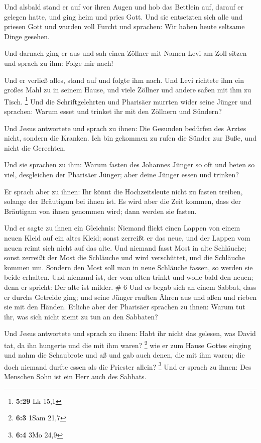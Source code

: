  Und alsbald stand er auf vor ihren Augen und hob das
Bettlein auf, darauf er gelegen hatte, und ging heim und pries Gott.
 Und sie entsetzten sich alle und priesen Gott und wurden
voll Furcht und sprachen: Wir haben heute seltsame Dinge gesehen.

 Und darnach ging er aus und sah einen Zöllner mit Namen
Levi am Zoll sitzen und sprach zu ihm: Folge mir nach!

 Und er verließ alles, stand auf und folgte ihm nach.
 Und Levi richtete ihm ein großes Mahl zu in seinem Hause,
und viele Zöllner und andere saßen mit ihm zu Tisch. \footnote{\textbf{5:29}
  Lk 15,1}  Und die Schriftgelehrten und Pharisäer murrten
wider seine Jünger und sprachen: Warum esset und trinket ihr mit den
Zöllnern und Sündern?

 Und Jesus antwortete und sprach zu ihnen: Die Gesunden
bedürfen des Arztes nicht, sondern die Kranken.  Ich bin
gekommen zu rufen die Sünder zur Buße, und nicht die Gerechten.

 Und sie sprachen zu ihm: Warum fasten des Johannes Jünger
so oft und beten so viel, desgleichen der Pharisäer Jünger; aber deine
Jünger essen und trinken?

 Er sprach aber zu ihnen: Ihr könnt die Hochzeitsleute
nicht zu fasten treiben, solange der Bräutigam bei ihnen ist.
 Es wird aber die Zeit kommen, dass der Bräutigam von ihnen
genommen wird; dann werden sie fasten.

 Und er sagte zu ihnen ein Gleichnis: Niemand flickt einen
Lappen von einem neuen Kleid auf ein altes Kleid; sonst zerreißt er das
neue, und der Lappen vom neuen reimt sich nicht auf das alte.
 Und niemand fasst Most in alte Schläuche; sonst zerreißt
der Most die Schläuche und wird verschüttet, und die Schläuche kommen
um.  Sondern den Most soll man in neue Schläuche fassen, so
werden sie beide erhalten.  Und niemand ist, der vom alten
trinkt und wolle bald den neuen; denn er spricht: Der alte ist milder.
\# 6  Und es begab sich an einem Sabbat, dass er durchs
Getreide ging; und seine Jünger rauften Ähren aus und aßen und rieben
sie mit den Händen.  Etliche aber der Pharisäer sprachen zu
ihnen: Warum tut ihr, was sich nicht ziemt zu tun an den Sabbaten?

 Und Jesus antwortete und sprach zu ihnen: Habt ihr nicht
das gelesen, was David tat, da ihn hungerte und die mit ihm waren?
\footnote{\textbf{6:3} 1Sam 21,7}  wie er zum Hause Gottes
einging und nahm die Schaubrote und aß und gab auch denen, die mit ihm
waren; die doch niemand durfte essen als die Priester allein?
\footnote{\textbf{6:4} 3Mo 24,9}  Und er sprach zu ihnen:
Des Menschen Sohn ist ein Herr auch des Sabbats.

